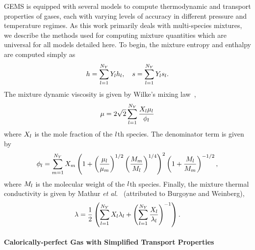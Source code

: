 GEMS is equipped with several models to compute thermodynamic and transport properties of gases, each with varying levels of accuracy in different pressure and temperature regimes. As this work primarily deals with multi-species mixtures, we describe the methods used for computing mixture quantities which are universal for all models detailed here. To begin, the mixture entropy and enthalpy are computed simply as
%
\begin{equation}
	h = \sum_{l = 1}^{N_Y} Y_{l} h_{l}, \quad s = \sum_{l = 1}^{N_Y} Y_{l} s_{l}.
\end{equation}
%
The mixture dynamic viscosity is given by Wilke's mixing law~\cite{Wilke1950},
%
\begin{equation}\label{eq:viscMix}
	\mu = 2 \sqrt{2} \sum_{l = 1}^{N_Y} \frac{X_{l} \mu_{l}}{\phi_{l}}
\end{equation}
%
where $X_{l}$ is the mole fraction of the $l$th species. The denominator term is given by
%
\begin{equation}\label{eq:viscMixDenom}
	\phi_{l} = \sum_{m = 1}^{N_Y} X_{m} \left( 1 + \left( \frac{\mu_{l}}{\mu_{m}} \right)^{1/2} \left( \frac{M_{m}}{M_{l}} \right)^{1/4} \right)^2 \left( 1 + \frac{M_{l}}{M_{m}} \right)^{-1/2},
\end{equation}
%
where $M_{l}$ is the molecular weight of the $l$th species. Finally, the mixture thermal conductivity is given by Mathur \textit{et al.}~\cite{Mathur1967} (attributed to Burgoyne and Weinberg),
%
\begin{equation}\label{eq:thermCondMix}
    \lambda = \frac{1}{2} \left( \sum_{l = 1}^{N_Y} X_{l} \lambda_{l} + \left(\sum_{l = 1}^{N_Y} \frac{X_{l}}{\lambda_{l}} \right)^{-1} \right).
\end{equation}


\paragraph*{Calorically-perfect Gas with Simplified Transport Properties}\mbox{}\\

